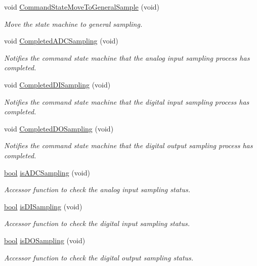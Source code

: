 \begin{DoxyCompactItemize}
void \hyperlink{group__command__state_ga62da533cf3e918233a8245c42959d0e5}{Command\-State\-Move\-To\-General\-Sample} (void)
\begin{DoxyCompactList}\small\item\em Move the state machine to general sampling. \end{DoxyCompactList}\item 
void \hyperlink{group__command__state_gaeef6d80f456cb6f79363946c49723bea}{Completed\-A\-D\-C\-Sampling} (void)
\begin{DoxyCompactList}\small\item\em Notifies the command state machine that the analog input sampling process has completed. \end{DoxyCompactList}\item 
void \hyperlink{group__command__state_ga6e3eb8b0a37d7aebb88e1667f3c222d2}{Completed\-D\-I\-Sampling} (void)
\begin{DoxyCompactList}\small\item\em Notifies the command state machine that the digital input sampling process has completed. \end{DoxyCompactList}\item 
void \hyperlink{group__command__state_ga1255ba36b41923ad73e72f1464412852}{Completed\-D\-O\-Sampling} (void)
\begin{DoxyCompactList}\small\item\em Notifies the command state machine that the digital output sampling process has completed. \end{DoxyCompactList}\item 
\hyperlink{group__data__types_ga0ecf26b576b9a54eca656b9be7ba6a06}{bool} \hyperlink{group__command__state_ga7dc77fb2cb66a1b11d987bdc8c75c060}{is\-A\-D\-C\-Sampling} (void)
\begin{DoxyCompactList}\small\item\em Accessor function to check the analog input sampling status. \end{DoxyCompactList}\item 
\hyperlink{group__data__types_ga0ecf26b576b9a54eca656b9be7ba6a06}{bool} \hyperlink{group__command__state_gab0e295861dce43803feb4bf235dedf71}{is\-D\-I\-Sampling} (void)
\begin{DoxyCompactList}\small\item\em Accessor function to check the digital input sampling status. \end{DoxyCompactList}\item 
\hyperlink{group__data__types_ga0ecf26b576b9a54eca656b9be7ba6a06}{bool} \hyperlink{group__command__state_gaf69a154f2311c13883ebbe0c1de90d44}{is\-D\-O\-Sampling} (void)
\begin{DoxyCompactList}\small\item\em Accessor function to check the digital output sampling status. \end{DoxyCompactList}\end{DoxyCompactItemize}


